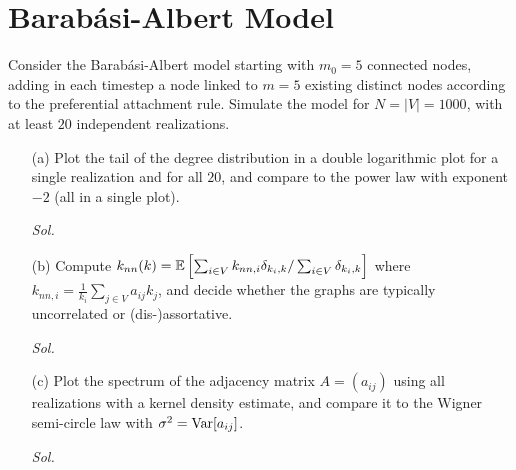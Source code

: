\section{Barab\'{a}si-Albert Model}

Consider the Barab\'{a}si-Albert model starting with $m_0 = 5$ connected nodes, adding in each timestep a node linked to $m=5$ existing distinct nodes according to the preferential attachment rule. Simulate the model for $N = |V| = 1000$, with at least $20$ independent realizations. 

\begin{enumerate}
    \item[(a)] Plot the tail of the degree distribution in a double logarithmic plot for a single realization and for all $20$, and compare to the power law with exponent $-2$ (all in a single plot).
    
    \textit{ Sol. }

    \item[(b)] Compute $k_{nn}(k) = \mathbb{E} \left[ \sum_{i \in V} k_{nn, i} \delta_{k_i, k} / \sum_{i\in V} \delta_{k_i, k}\right]$ where $k_{nn, i} = \frac{1}{k_i} \sum_{j \in V} a_{ij} k_j$, and decide whether the graphs are typically uncorrelated or (dis-)assortative.
    
    \textit{ Sol. }

    \item[(c)] Plot the spectrum of the adjacency matrix $A = (a_{ij})$ using all realizations with a kernel density estimate, and compare it to the Wigner semi-circle law with $\sigma^2 = \mathrm{Var} [a_{ij}]$.
    
    \textit{ Sol. }

\end{enumerate}